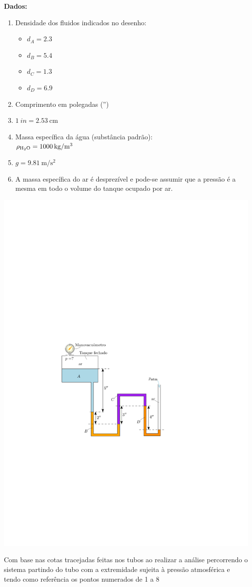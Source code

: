\documentclass[
	a4paper,
	12pt,
	brazilian
]{article}
\begin{document}
	\textbf{Dados:}
	\begin{enumerate}
		\item Densidade dos fluidos indicados no desenho:
		\begin{itemize}
			\item $d_{A}=2.3$
			\item $d_{B}=5.4$
			\item $d_{C}=1.3$
			\item $d_{D}=6.9$
		\end{itemize}
		\item Comprimento em polegadas ('')
		\item $\SI{1}{in}=\SI{2.53}{\centi\meter}$
		\item Massa específica da água (substância padrão):\\
		$\rho_{\ce{H2O}}=\SI{1000}{\kilogram/\meter^{3}}$
		\item $g=\SI{9.81}{\meter/\second^{2}}$
		\item A massa específica do ar é desprezível e pode-se assumir que a pressão é a mesma em todo o volume do tanque ocupado por ar.
	\end{enumerate}
	\begin{center}
		\includegraphics[width=.7\linewidth]{assets/images/ex5}
	\end{center}
	Com base nas cotas tracejadas feitas nos tubos ao realizar a análise percorrendo o sistema partindo do tubo com a extremidade sujeita à pressão atmosférica e tendo como referência os pontos numerados de 1 a 8
\end{document}
